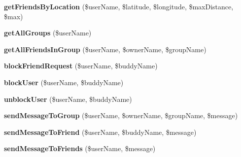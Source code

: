 \begin{DoxyCompactItemize}
\item 
\hypertarget{class_buddy_service_a6aefad1406be45e5bc7169373bd74d89}{{\bfseries get\+Friends\+By\+Location} (\$user\+Name, \$latitude, \$longitude, \$max\+Distance, \$max)}\label{class_buddy_service_a6aefad1406be45e5bc7169373bd74d89}

\item 
\hypertarget{class_buddy_service_a265b9fca353e737e9c51292a5791d31f}{{\bfseries get\+All\+Groups} (\$user\+Name)}\label{class_buddy_service_a265b9fca353e737e9c51292a5791d31f}

\item 
\hypertarget{class_buddy_service_af276ba909b8ba0f951b67a7c284484ac}{{\bfseries get\+All\+Friends\+In\+Group} (\$user\+Name, \$owner\+Name, \$group\+Name)}\label{class_buddy_service_af276ba909b8ba0f951b67a7c284484ac}

\item 
\hypertarget{class_buddy_service_a62674c85dbb4931816f7e0f2879c56ca}{{\bfseries block\+Friend\+Request} (\$user\+Name, \$buddy\+Name)}\label{class_buddy_service_a62674c85dbb4931816f7e0f2879c56ca}

\item 
\hypertarget{class_buddy_service_a2c69fc1bcc20a31e9a9ec805f566ef37}{{\bfseries block\+User} (\$user\+Name, \$buddy\+Name)}\label{class_buddy_service_a2c69fc1bcc20a31e9a9ec805f566ef37}

\item 
\hypertarget{class_buddy_service_aa57081065676b636145cff4813c7ccd9}{{\bfseries unblock\+User} (\$user\+Name, \$buddy\+Name)}\label{class_buddy_service_aa57081065676b636145cff4813c7ccd9}

\item 
\hypertarget{class_buddy_service_a5ada8c759e5c82250be7b2f5a327cf6a}{{\bfseries send\+Message\+To\+Group} (\$user\+Name, \$owner\+Name, \$group\+Name, \$message)}\label{class_buddy_service_a5ada8c759e5c82250be7b2f5a327cf6a}

\item 
\hypertarget{class_buddy_service_a3e49593b86102ecc370b7c3a39bddc92}{{\bfseries send\+Message\+To\+Friend} (\$user\+Name, \$buddy\+Name, \$message)}\label{class_buddy_service_a3e49593b86102ecc370b7c3a39bddc92}

\item 
\hypertarget{class_buddy_service_a24fd7377b87d8d00702b0403fe0cd0ef}{{\bfseries send\+Message\+To\+Friends} (\$user\+Name, \$message)}\label{class_buddy_service_a24fd7377b87d8d00702b0403fe0cd0ef}


\end{DoxyCompactItemize}
